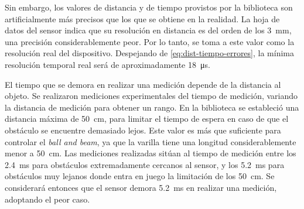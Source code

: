 Sin embargo, los valores de distancia y de tiempo provistos por la biblioteca son artificialmente más precisos que los que se obtiene en la realidad. La hoja de datos del sensor indica que su resolución en distancia es del orden de los \qty{3}{\mm}, una precisión considerablemente peor. Por lo tanto, se toma a este valor como la resolución real del dispositivo. Despejando de \eqref{eq:dist-tiempo-errores}, la mínima resolución temporal real será de aproximadamente \qty{18}{\us}.

El tiempo que se demora en realizar una medición depende de la distancia al objeto. Se realizaron mediciones experimentales del tiempo de medición, variando la distancia de medición para obtener un rango. En la biblioteca se estableció una distancia máxima de \qty{50}{\cm}, para limitar el tiempo de espera en caso de que el obstáculo se encuentre demasiado lejos. Este valor es más que suficiente para controlar el \emph{ball and beam}, ya que la varilla tiene una longitud considerablemente menor a \qty{50}{\cm}. Las mediciones realizadas sitúan al tiempo de medición entre los \qty{2.4}{\ms} para obstáculos extremadamente cercanos al sensor, y los \qty{5.2}{\ms} para obstáculos muy lejanos donde entra en juego la limitación de los \qty{50}{\cm}. Se considerará entonces que el sensor demora \qty{5.2}{\ms} en realizar una medición, adoptando el peor caso.


